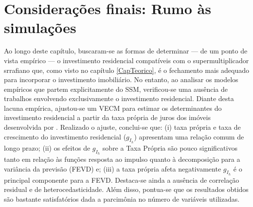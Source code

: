 \section{Considerações finais: Rumo às simulações}
\label{Conclucao_Empirica}


Ao longo deste capítulo, buscaram-se as formas de determinar --- de um ponto de vista empírico --- o investimento residencial compatíveis com o supermultiplicador srrafiano que, como visto no capítulo \ref{CapTeorico}, é o fechamento mais adequado para incorporar o investimento imobiliário.
No entanto, ao analisar os modelos empíricos que partem explicitamente do SSM, verificou-se uma ausência de trabalhos envolvendo exclusivamente o investimento residencial. 
Diante desta lacuna empírica, ajustou-se um VECM para estimar os determinantes do investimento residencial a partir da taxa própria de juros dos imóveis desenvolvida por \textcite{teixeira_crescimento_2015}. Realizado o ajuste, conclui-se que: 
(i) taxa própria e taxa de crescimento do investimento residencial ($g_{I_h}$) apresentam uma relação comum de longo prazo; 
(ii) os efeitos de $g_{I_h}$ sobre a Taxa Própria são pouco significativos tanto em relação às funções resposta ao impulso quanto à decomposição para a variância da previsão (FEVD) e;
(iii) a taxa própria afeta negativamente $g_{I_h}$ é o principal componente para a FEVD. 
Destaca-se ainda a ausência de correlação residual e de heterocedasticidade. Além disso, pontua-se que os resultados obtidos são bastante satisfatórios dada a parcimônia no número de variáveis utilizadas.

